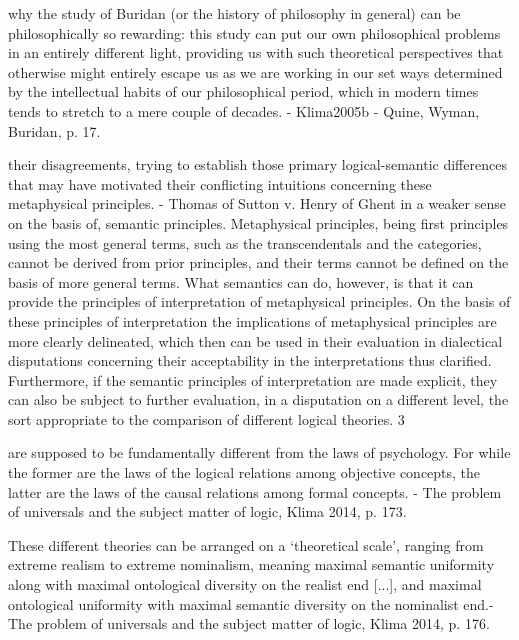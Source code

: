 \documentclass[]{article}
\begin{document}
why the study of
Buridan (or the history of philosophy in general) can be philosophically so rewarding: this
study can put our own philosophical problems in an entirely different light, providing us with
such theoretical perspectives that otherwise might entirely escape us as we are working in our
set ways determined by the intellectual habits of our philosophical period, which in modern
times tends to stretch to a mere couple of decades. - Klima2005b - Quine, Wyman, Buridan, p. 17.

their disagreements, trying to establish those primary logical-semantic differences that may have
motivated their conflicting intuitions concerning these metaphysical principles. - Thomas of Sutton v. Henry of Ghent
in a weaker sense on the basis of, semantic principles. Metaphysical principles, being first principles
using the most general terms, such as the transcendentals and the categories, cannot be derived from
prior principles, and their terms cannot be defined on the basis of more general terms. What
semantics can do, however, is that it can provide the principles of interpretation of metaphysical
principles. On the basis of these principles of interpretation the implications of metaphysical
principles are more clearly delineated, which then can be used in their evaluation in dialectical
disputations concerning their acceptability in the interpretations thus clarified. Furthermore, if the
semantic principles of interpretation are made explicit, they can also be subject to further evaluation,
in a disputation on a different level, the sort appropriate to the comparison of different logical
theories. 3



are supposed to be fundamentally diﬀerent from the laws of psychology.
For while the former are the laws of the logical relations among objective
concepts, the latter are the laws of the causal relations among formal
concepts. - The problem of universals and the subject matter of logic, Klima 2014, p. 173.

These different theories can be arranged on a `theoretical scale', ranging from extreme realism to extreme nominalism, meaning maximal semantic uniformity along with maximal ontological diversity on the realist end [...], and maximal ontological uniformity with maximal semantic diversity on the nominalist end.- The problem of universals and the subject matter of logic, Klima 2014, p. 176.
\end{document}
